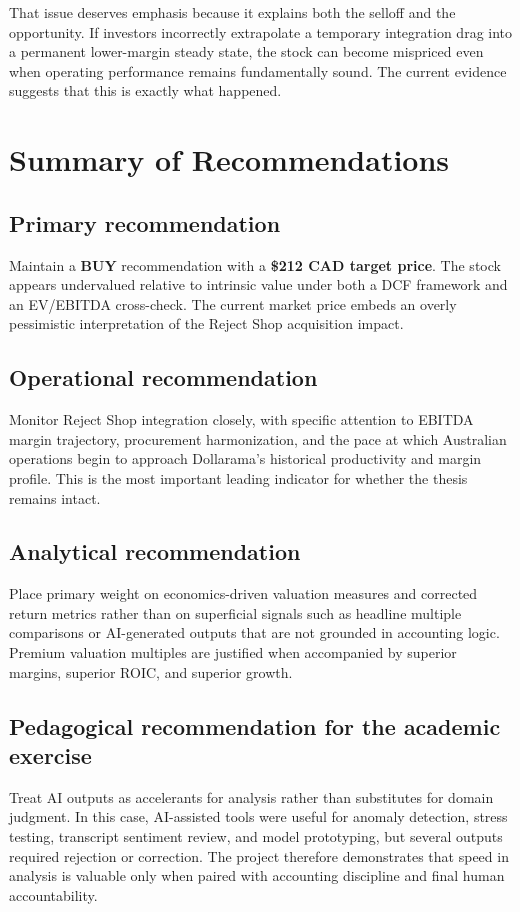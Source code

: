 \documentclass[11pt]{article}
\begin{document}
That issue deserves emphasis because it explains both the selloff and the opportunity. If investors incorrectly extrapolate a temporary integration drag into a permanent lower-margin steady state, the stock can become mispriced even when operating performance remains fundamentally sound. The current evidence suggests that this is exactly what happened.

\section{Summary of Recommendations}
\subsection{Primary recommendation}
Maintain a \textbf{BUY} recommendation with a \textbf{\$212 CAD target price}. The stock appears undervalued relative to intrinsic value under both a DCF framework and an EV/EBITDA cross-check. The current market price embeds an overly pessimistic interpretation of the Reject Shop acquisition impact.

\subsection{Operational recommendation}
Monitor Reject Shop integration closely, with specific attention to EBITDA margin trajectory, procurement harmonization, and the pace at which Australian operations begin to approach Dollarama's historical productivity and margin profile. This is the most important leading indicator for whether the thesis remains intact.

\subsection{Analytical recommendation}
Place primary weight on economics-driven valuation measures and corrected return metrics rather than on superficial signals such as headline multiple comparisons or AI-generated outputs that are not grounded in accounting logic. Premium valuation multiples are justified when accompanied by superior margins, superior ROIC, and superior growth.

\subsection{Pedagogical recommendation for the academic exercise}
Treat AI outputs as accelerants for analysis rather than substitutes for domain judgment. In this case, AI-assisted tools were useful for anomaly detection, stress testing, transcript sentiment review, and model prototyping, but several outputs required rejection or correction. The project therefore demonstrates that speed in analysis is valuable only when paired with accounting discipline and final human accountability.
\end{document}
